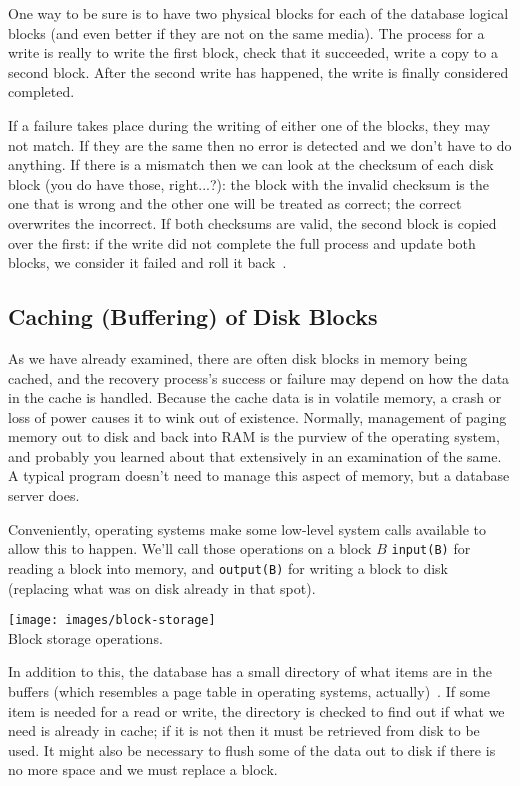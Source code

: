 \documentclass[a4paper]{report}
\begin{document}
One way to be sure is to have two physical blocks for each of the database logical blocks (and even better if they are not on the same media). The process for a write is really to write the first block, check that it succeeded, write a copy to a second block. After the second write has happened, the write is finally considered completed. 

If a failure takes place during the writing of either one of the blocks, they may not match. If they are the same then no error is detected and we don't have to do anything. If there is a mismatch then we can look at the checksum of each disk block (you do have those, right...?): the block with the invalid checksum is the one that is wrong and the other one will be treated as correct; the correct overwrites the incorrect. If both checksums are valid, the second block is copied over the first: if the write did not complete the full process and update both blocks, we consider it failed and roll it back~\cite{dsc}.

\subsection*{Caching (Buffering) of Disk Blocks}

As we have already examined, there are often disk blocks in memory being cached, and the recovery process's success or failure may depend on how the data in the cache is handled. Because the cache data is in volatile memory, a crash or loss of power causes it to wink out of existence. Normally, management of paging memory out to disk and back into RAM is the purview of the operating system, and probably you learned about that extensively in an examination of the same. A typical program doesn't need to manage this aspect of memory, but a database server does.

Conveniently, operating systems make some low-level system calls available to allow this to happen. We'll call those operations on a block $B$ \texttt{input(B)} for reading a block into memory, and \texttt{output(B)} for writing a block to disk (replacing what was on disk already in that spot). 

\begin{center}
	\texttt{[image: images/block-storage]}\\
	Block storage operations.~\cite{dsc}
\end{center}

In addition to this, the database has a small directory of what items are in the buffers (which resembles a page table in operating systems, actually)~\cite{fds}. If some item is needed for a read or write, the directory is checked to find out if what we need is already in cache; if it is not then it must be retrieved from disk to be used. It might also be necessary to flush some of the data out to disk if there is no more space and we must replace a block.
\end{document}
